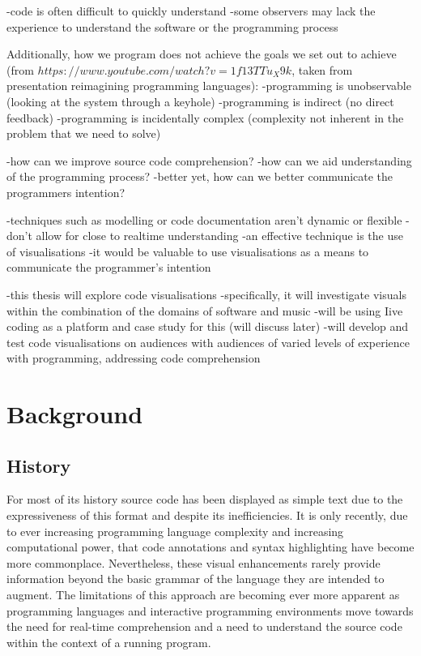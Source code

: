 -code is often difficult to quickly understand
-some observers may lack the experience to understand the software or the programming process

Additionally, how we program does not achieve the goals we set out to achieve (from $https://www.youtube.com/watch?v=1f13TTu_X9k$, taken from presentation reimagining programming languages):
-programming is unobservable (looking at the system through a keyhole)
-programming is indirect (no direct feedback)
-programming is incidentally complex (complexity not inherent in the problem that we need to solve)




-how can we improve source code comprehension?
-how can we aid understanding of the programming process?
-better yet, how can we better communicate the programmers intention?

-techniques such as modelling or code documentation aren’t dynamic or flexible
-don’t allow for close to realtime understanding
-an effective technique is the use of visualisations
-it would be valuable to use visualisations as a means to communicate the programmer’s intention


-this thesis will explore code visualisations
-specifically, it will investigate visuals within the combination of the domains of software and music
-will be using Iive coding as a platform and case study for this (will discuss later)
-will develop and test code visualisations on audiences with audiences of varied levels of experience with programming, addressing code comprehension

\section{Background}
\label{sec:basis}

\subsection{History}

For most of its history source code has been displayed as simple text due to the expressiveness of this format and despite its inefficiencies. It is only recently, due to ever increasing programming language complexity and increasing computational power, that code annotations and syntax highlighting have become more commonplace. Nevertheless, these visual enhancements rarely provide information beyond the basic grammar of the language they are intended to augment. The limitations of this approach are becoming ever more apparent as programming languages and interactive programming environments move towards the need for real-time comprehension and a need to understand the source code within the context of a running program.\\

